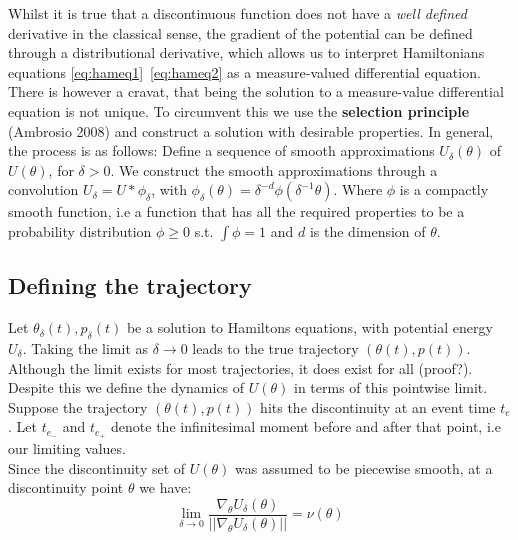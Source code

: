\documentclass[]{report}
\newcommand{\tif}{\textit}
\begin{document}
Whilst it is true that a discontinuous function does not have a \tif{well defined} derivative in the classical sense, the gradient of the potential can be defined through a distributional derivative, which allows us to interpret Hamiltonians equations \ref{eq:hameq1}\ \ref{eq:hameq2} as a measure-valued differential equation. There is however a cravat, that being the solution to a measure-value differential equation is not unique. To circumvent this we use the \textbf{selection principle} (Ambrosio 2008) and construct a solution with desirable properties.
In general, the process is as follows: Define a sequence of smooth approximations $U_{\delta}(\theta)$ of $U(\theta)$, for $\delta > 0$. We construct the smooth approximations through a convolution $U_{\delta} = U \ast \phi_{\delta}$, with $\phi_{\delta}(\theta) = \delta^{-d}\phi(\delta^{-1}\theta)$. Where $\phi$ is a compactly smooth function, i.e a function that has all the required properties to be a probability distribution $\phi \ge 0$ s.t. $\int \phi = 1$ and $d$ is the dimension of $\theta$.

\subsection{Defining the trajectory}
Let $\theta_{\delta}(t), p_{\delta}(t)$ be a solution to Hamiltons equations, with potential energy $U_{\delta}$. Taking the limit as $\delta \rightarrow 0$ leads to the true trajectory $(\theta(t), p(t))$. Although the limit exists for most trajectories, it does exist for all (proof?). Despite this we define the dynamics of $U(\theta)$ in terms of this pointwise limit. 
Suppose the trajectory $(\theta(t), p(t))$ hits the discontinuity at an event time $t_{e}$. Let $t_{e_{-}}$ and $t_{e_{+}}$ denote the infinitesimal moment before and after that point, i.e our limiting values.\\
Since the discontinuity set of $U(\theta)$ was assumed to be piecewise smooth, at a discontinuity point $\theta$ we have:
\begin{equation}
\label{eq:discpoint}
 \lim_{\delta \to 0} \frac{\nabla_{\theta} U_{\delta}(\theta)}{||\nabla_{\theta}U_{\delta}(\theta)||}=\nu(\theta) 
\end{equation}   
\end{document}
